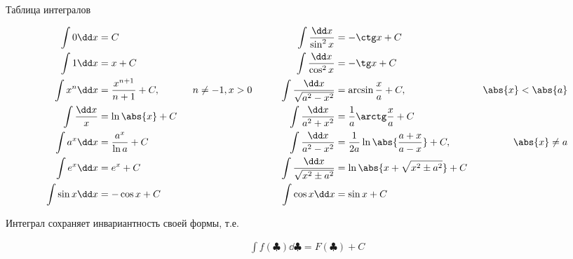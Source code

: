 
\begin{remark}
  Таблица интегралов

  \begin{align*}
    \int 0 \dd x & = C
    && \qquad &
      \int \frac{\dd x}{\sin^2 x} & = -\ctg x + C
    \\
      \int 1 \dd x & = x + C
    && \qquad &
      \int \frac{\dd x}{\cos^2 x} & = -\tg x + C
    \\
      \int x^n \dd x & = \frac{x^{n + 1}}{n + 1} + C,
      & \hspace{6pt} n \neq -1, x > 0
    & \qquad &
      \int \frac{\dd x}{\sqrt{a^2 - x^2}} & = \arcsin \frac{x}{a} + C,
      & \hspace{6pt} \abs{x} < \abs{a}
    \\
      \int \frac{\dd x}{x} & = \ln \abs{x} + C
    && \qquad &
      \int \frac{\dd x}{a^2 + x^2} & = \frac{1}{a} \arctg \frac{x}{a} + C
    \\
      \int a^{x} \dd x & = \frac{a^{x}}{\ln a} + C
    && \qquad &
      \int \frac{\dd x}{a^2 - x^2}
      & = \frac{1}{2a} \ln \abs{\frac{a + x}{a - x}} + C,
      & \hspace{6pt} \abs{x} \neq a
    \\
      \int e^{x} \dd x & = e^{x} + C
    && \qquad &
      \int \frac{\dd x}{\sqrt{x^2 \pm a^2}}
      & = \ln \abs{x + \sqrt{x^2 \pm a^2}} + C
    \\
      \int \sin x \dd x & = -\cos x + C
    && \qquad &
      \int \cos x \dd x & = \sin x + C
  \end{align*}
\end{remark}

\begin{remark}
  Интеграл сохраняет инвариантность своей формы, т.е.

  \begin{align*}
    \int f(\clubsuit) \dd \clubsuit = F(\clubsuit) + C
  \end{align*}
\end{remark}

